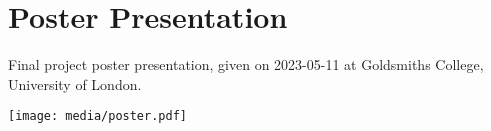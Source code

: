 \setlength{\headwidth}{\textwidth}
{
\setlength{\parindent}{0pt}
\section{Poster Presentation}
Final project poster presentation, given on 2023-05-11 at Goldsmiths College, University of London.

\texttt{[image: media/poster.pdf]}
}